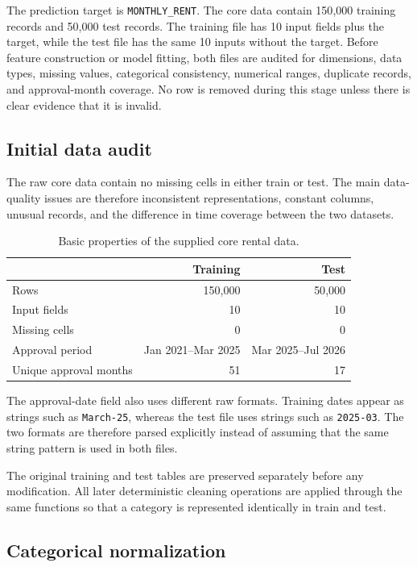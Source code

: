 \documentclass[10pt]{article}
\begin{document}
The prediction target is \texttt{MONTHLY\_RENT}.
The core data contain 150{,}000 training records and 50{,}000 test records.
The training file has 10 input fields plus the target, while the test file has the same 10 inputs without the target.
Before feature construction or model fitting, both files are audited for dimensions, data types, missing values, categorical consistency, numerical ranges, duplicate records, and approval-month coverage.
No row is removed during this stage unless there is clear evidence that it is invalid.

\subsection{Initial data audit}

The raw core data contain no missing cells in either train or test.
The main data-quality issues are therefore inconsistent representations, constant columns, unusual records, and the difference in time coverage between the two datasets.

\begin{table}[h]
\centering
\small
\begin{tabular}{lrr}
\toprule
 & Training & Test \\
\midrule
Rows & 150{,}000 & 50{,}000 \\
Input fields & 10 & 10 \\
Missing cells & 0 & 0 \\
Approval period & Jan 2021--Mar 2025 & Mar 2025--Jul 2026 \\
Unique approval months & 51 & 17 \\
\bottomrule
\end{tabular}
\caption{Basic properties of the supplied core rental data.}
\label{tab:core-overview}
\end{table}

The approval-date field also uses different raw formats.
Training dates appear as strings such as \texttt{March-25}, whereas the test file uses strings such as \texttt{2025-03}.
The two formats are therefore parsed explicitly instead of assuming that the same string pattern is used in both files.

The original training and test tables are preserved separately before any modification.
All later deterministic cleaning operations are applied through the same functions so that a category is represented identically in train and test.

\subsection{Categorical normalization}
\end{document}
